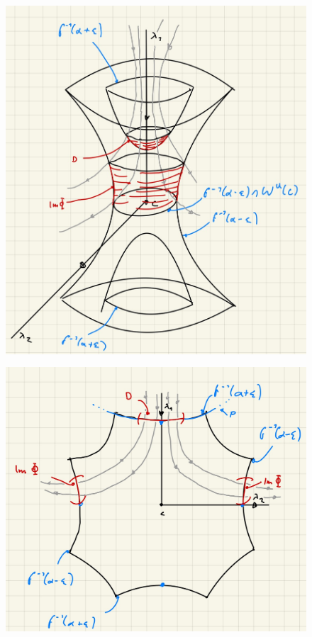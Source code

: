 \begin{bigproof}
    \begin{figure}
        \centering
        \begin{minipage}{.5\textwidth}
          \centering
          \includegraphics[width=.85\linewidth]{../resources/bew-gebrochene-trajektorien-sind-1-dim-mannigfaltigkeit-1.JPG}
          \label{fig: test1}
        \end{minipage}%
        \begin{minipage}{.5\textwidth}
          \centering
          \includegraphics[width=.85\linewidth]{../resources/bew-gebrochene-trajektorien-sind-1-dim-mannigfaltigkeit-2.JPG}
          \label{fig: test2}
        \end{minipage}
    \end{figure}


\end{bigproof}
